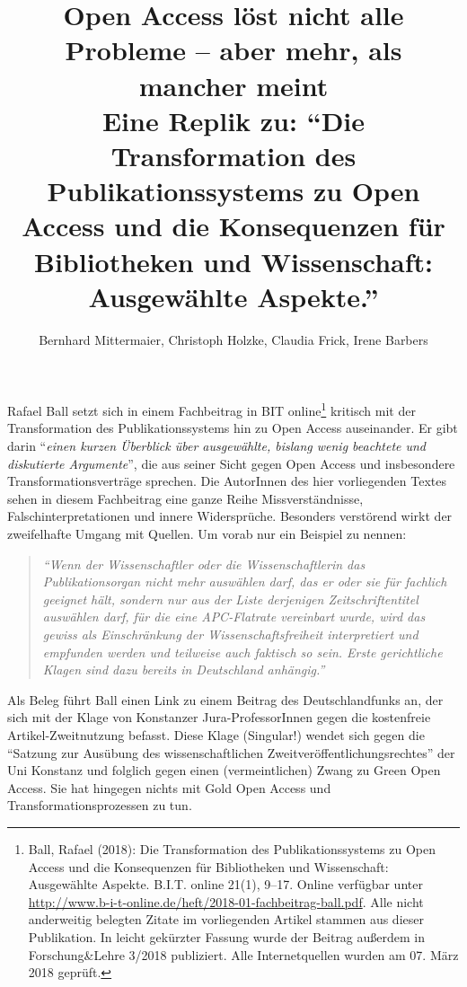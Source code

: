 \documentclass[a4paper,
fontsize=11pt,
oneside,
numbers=noperiodatend,
parskip=half-,
bibliography=totoc,
final
]{scrartcl}
\title{\LARGE{Open Access löst nicht alle Probleme – aber mehr, als mancher meint\\
Eine Replik zu: \enquote{Die Transformation des Publikationssystems zu Open Access und die Konsequenzen für Bibliotheken und Wissenschaft: Ausgewählte Aspekte.}}} %
\author{Bernhard Mittermaier, Christoph Holzke, Claudia Frick, Irene Barbers} %
\date{}
\begin{document}
\maketitle
\thispagestyle{fancyplain} 


Rafael Ball setzt sich in einem Fachbeitrag in BIT online\footnote{Ball,
  Rafael (2018): Die Transformation des Publikationssystems zu Open
  Access und die Konsequenzen für Bibliotheken und Wissenschaft:
  Ausgewählte Aspekte. B.I.T. online 21(1), 9--17. Online verfügbar
  unter
  \url{http://www.b-i-t-online.de/heft/2018-01-fachbeitrag-ball.pdf}.
  Alle nicht anderweitig belegten Zitate im vorliegenden Artikel stammen
  aus dieser Publikation. In leicht gekürzter Fassung wurde der Beitrag
  außerdem in Forschung\&Lehre 3/2018 publiziert. Alle Internetquellen
  wurden am 07. März 2018 geprüft.} kritisch mit der Transformation des
Publikationssystems hin zu Open Access auseinander. Er gibt darin
\enquote{\emph{einen kurzen Überblick über ausgewählte, bislang wenig
beachtete und diskutierte Argumente}}, die aus seiner Sicht gegen Open
Access und insbesondere Transformationsverträge sprechen. Die AutorInnen
des hier vorliegenden Textes sehen in diesem Fachbeitrag eine ganze
Reihe Missverständnisse, Falschinterpretationen und innere Widersprüche.
Besonders verstörend wirkt der zweifelhafte Umgang mit Quellen. Um vorab
nur ein Beispiel zu nennen:

\begin{quote}
\emph{\enquote{Wenn der Wissenschaftler oder die Wissenschaftlerin das
Publikationsorgan nicht mehr auswählen darf, das er oder sie für
fachlich geeignet hält, sondern nur aus der Liste derjenigen
Zeitschriftentitel auswählen darf, für die eine APC-Flatrate vereinbart
wurde, wird das gewiss als Einschränkung der Wissenschaftsfreiheit
interpretiert und empfunden werden und teilweise auch faktisch so sein.
Erste gerichtliche Klagen sind dazu bereits in Deutschland anhängig.}}
\end{quote}

Als Beleg führt Ball einen Link zu einem Beitrag des Deutschlandfunks
an, der sich mit der Klage von Konstanzer Jura-ProfessorInnen gegen die
kostenfreie Artikel-Zweitnutzung befasst. Diese Klage (Singular!) wendet
sich gegen die \enquote{Satzung zur Ausübung des wissenschaftlichen
Zweitveröffentlichungsrechtes} der Uni Konstanz und folglich gegen einen
(vermeintlichen) Zwang zu Green Open Access. Sie hat hingegen nichts mit
Gold Open Access und Transformationsprozessen zu tun.
\end{document}
